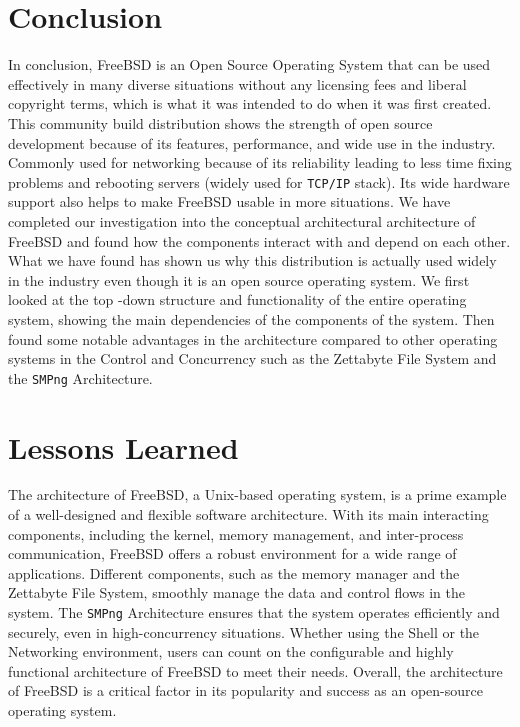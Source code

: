 \documentclass[12pt, dvipsnames, a4paper]{article}
\newcommand{\code}[1]{\texttt{#1}}
\begin{document}
\section{Conclusion}
In conclusion, FreeBSD is an Open Source Operating System that can be used effectively in many diverse situations without any licensing fees and liberal copyright terms, which is what it was intended to do when it was first created. This community build distribution shows the strength of open source development because of its features, performance, and wide use in the industry. Commonly used for networking because of its reliability leading to less time fixing problems and rebooting servers (widely used for \code{TCP/IP} stack). Its wide hardware support also helps to make FreeBSD usable in more situations. We have completed our investigation into the conceptual architectural architecture of FreeBSD and found how the components interact with and depend on each other. What we have found has shown us why this distribution is actually used widely in the industry even though it is an open source operating system. We first looked at the top -down structure and functionality of the entire operating system, showing the main dependencies of the components of the system. Then found some notable advantages in the architecture compared to other operating systems in the Control and Concurrency such as the Zettabyte File System and the \code{SMPng} Architecture.

\section{Lessons Learned}
The architecture of FreeBSD, a Unix-based operating system, is a prime example of a well-designed and flexible software architecture. With its main interacting components, including the kernel, memory management, and inter-process communication, FreeBSD offers a robust environment for a wide range of applications. Different components, such as the memory manager and the Zettabyte File System, smoothly manage the data and control flows in the system. The \code{SMPng} Architecture ensures that the system operates efficiently and securely, even in high-concurrency situations. Whether using the Shell or the Networking environment, users can count on the configurable and highly functional architecture of FreeBSD to meet their needs. Overall, the architecture of FreeBSD is a critical factor in its popularity and success as an open-source operating system.
\clearpage
\end{document}
